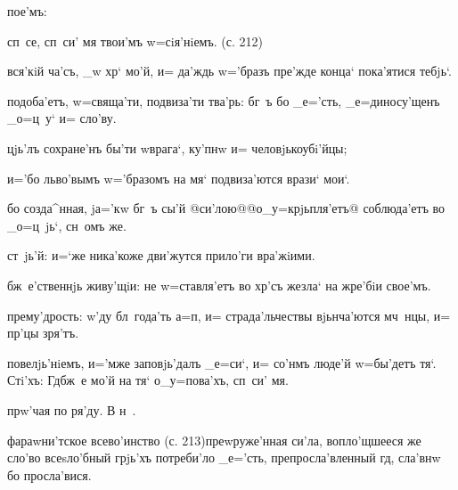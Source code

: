 
пое'мъ:

сп~се, сп~си' мя твои'мъ w=сiя'нiемъ. (с. 212)

вся'кiй ча'съ, _w хр` мо'й, и= да'ждь w='бразъ 
пре'жде конца` пока'ятися тебjь`.

подоба'етъ, w=свяща'ти, подвиза'ти тва'рь: бг~ъ бо 
_е='сть, _е=диносу'щенъ _о=ц~у` и= сло'ву.



цjь'лъ сохране'нъ бы'ти w\т врага`, ку'пнw и= 
человjькоубi'йцы;

и='бо льво'вымъ w='бразомъ на мя` подвиза'ются врази` 
мои`.

бо созда^нная, jа='кw бг~ъ сы'й 
@си'лою@{@о_у=крjьпля'етъ@} соблюда'етъ во _о=ц~jь`, 
сн~омъ же.



ст~jь'й: и=`же ника'коже дви'жутся прило'ги вра'жiими.

бж~е'ственнjь живу'щiи: не w=ставля'етъ во хр'съ 
жезла` на жре'бiи свое'мъ.

прему'дрость: w'ду бл~года'ть а=п, и= 
страда'льчествы вjьнча'ются мч~нцы, и= пр'цы зря'тъ.


повелjь'нiемъ, и='мже заповjь'далъ _е=си`, и= со'нмъ 
люде'й w=бы'детъ тя`. Стi'хъ: Гд бж~е мо'й на тя` 
о_у=пова'хъ, сп~си' мя.

прw'чая по ря'ду. В%
н~.%



фараwни'тское всево'инство (с. 213)преwруже'нная си'ла, 
вопло'щшееся же сло'во всеsло'бный грjь'хъ потреби'ло 
_е='сть, препросла'вленный гд, сла'внw бо просла'вися.

